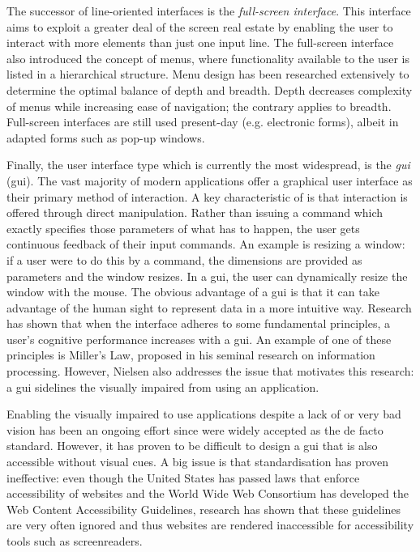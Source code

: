 The successor of line-oriented interfaces is the \textit{full-screen interface}. This interface aims to exploit a greater deal of the screen real estate by enabling the user to interact with more elements than just one input line. The full-screen interface also introduced the concept of menus, where functionality available to the user is listed in a hierarchical structure. Menu design has been researched extensively\cite{paap1986optimal, landauer1985selection, fisher1990optimal} to determine the optimal balance of depth and breadth. Depth decreases complexity of menus while increasing ease of navigation; the contrary applies to breadth. Full-screen interfaces are still used present-day (e.g. electronic forms), albeit in adapted forms such as pop-up windows.

Finally, the user interface type which is currently the most widespread, is the \textit{\acrlong{gui}} (\acrshort{gui}). The vast majority of modern applications offer a graphical user interface as their primary method of interaction. A key characteristic of  is that interaction is offered through direct manipulation. Rather than issuing a command which exactly specifies those parameters of what has to happen, the user gets continuous feedback of their input commands. An example is resizing a window: if a user were to do this by a command, the dimensions are provided as parameters and the window resizes. In a \acrshort{gui}, the user can dynamically resize the window with the mouse. The obvious advantage of a \acrshort{gui} is that it can take advantage of the human sight to represent data in a more intuitive way. Research has shown that when the interface adheres to some fundamental principles, a user's cognitive performance increases with a \acrshort{gui}. An example of one of these principles is Miller's Law, proposed in his seminal research on information processing\cite{miller1956magical}. However, Nielsen also addresses the issue that motivates this research: a \acrshort{gui} sidelines the visually impaired from using an application.

Enabling the visually impaired to use applications despite a lack of or very bad vision has been an ongoing effort since  were widely accepted as the de facto standard\cite{boyd1990graphical}. However, it has proven to be difficult to design a \acrshort{gui} that is also accessible without visual cues. A big issue is that standardisation has proven ineffective: even though the United States has passed laws that enforce accessibility of websites\cite{Secti81:online} and the World Wide Web Consortium has developed the Web Content Accessibility Guidelines\cite{WebCo83:online}, research has shown that these guidelines are very often ignored and thus websites are rendered inaccessible for accessibility tools such as screenreaders\cite{leuthold2008beyond}.

